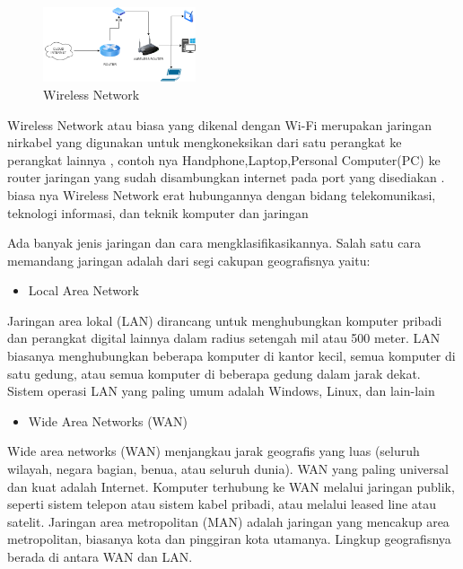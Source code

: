 \documentclass[conference]{IEEEtran}
\begin{document}
\begin{figure}[h]
    \centering
    \includegraphics[width=0.4\textwidth]{1.png}
    \caption{Wireless Network}
\end{figure}

Wireless Network atau biasa yang dikenal dengan Wi-Fi merupakan jaringan nirkabel yang digunakan
untuk mengkoneksikan dari satu perangkat ke perangkat lainnya ,
contoh nya Handphone,Laptop,Personal Computer(PC)
ke router jaringan yang sudah disambungkan internet pada port yang disediakan . biasa nya Wireless Network  
erat hubungannya dengan bidang telekomunikasi, teknologi informasi, dan teknik komputer dan jaringan 



Ada banyak jenis jaringan dan cara mengklasifikasikannya. Salah satu cara memandang jaringan adalah dari segi cakupan geografisnya yaitu:

\begin{itemize}
    \item Local Area Network
\end{itemize}

Jaringan area lokal (LAN) dirancang untuk menghubungkan komputer pribadi dan perangkat digital lainnya dalam radius setengah mil atau 500 meter. 
LAN biasanya menghubungkan beberapa komputer di kantor kecil, semua komputer di satu gedung, atau semua komputer di beberapa gedung dalam jarak dekat.
Sistem operasi LAN yang paling umum adalah Windows, Linux, dan lain-lain

\begin{itemize}
    \item Wide Area Networks (WAN)
\end{itemize}
Wide area networks (WAN) menjangkau jarak geografis yang luas (seluruh wilayah, negara bagian, benua, atau seluruh dunia). 
WAN yang paling universal dan kuat adalah Internet.
Komputer terhubung ke WAN melalui jaringan publik, seperti sistem telepon atau sistem kabel pribadi, atau melalui leased line atau satelit. 
Jaringan area metropolitan (MAN) adalah jaringan yang mencakup area metropolitan, biasanya kota dan pinggiran kota utamanya. 
Lingkup geografisnya berada di antara WAN dan LAN.
\end{document}
